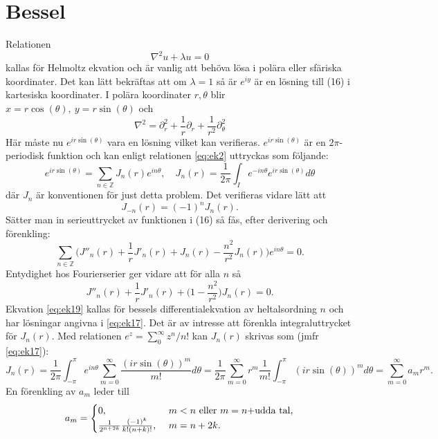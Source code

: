 \documentclass{article}
\begin{document}
\section{Bessel}
Relationen
\begin{equation}
    \nabla^2u+\lambda u=0
\end{equation} 
kallas för Helmoltz ekvation och är vanlig att behöva lösa i polära eller sfäriska koordinater. Det kan lätt bekräftas att om $\lambda=1$ så är $e^{iy}$ är en lösning till (16) i kartesiska koordinater. I polära koordinater $r,\theta$ blir $x=r\cos(\theta), \ y=r\sin(\theta)$ och
$$
\nabla^2=\partial_r^2+\frac{1}{r}\partial_r+\frac{1}{r^2}\partial_{\theta}^2
$$
Här måste nu $e^{ir\sin(\theta)}$ vara en lösning vilket kan verifieras. $e^{ir\sin(\theta)}$ är en $2\pi$-periodisk funktion och kan enligt relationen \eqref{eq:ek2} uttryckas som följande:
\begin{equation}\label{eq:ek17}
    e^{ir\sin(\theta)}=\sum_{n\in\mathbb{Z}}J_n(r)e^{in\theta}, \quad J_n(r)=\frac{1}{2\pi}\int_Ie^{-in\theta}e^{ir\sin(\theta)}d\theta
\end{equation}
där $J_n$ är konventionen för just detta problem. Det verifieras vidare lätt att
\begin{equation}\label{eq:ek18}
    J_{-n}(r)=(-1)^nJ_n(r).
\end{equation}
Sätter man in serieuttrycket av funktionen i (16) så fås, efter derivering och förenkling:
$$
\sum_{n\in\mathbb{Z}}\Big(J''_n(r)+\frac{1}{r}J'_n(r)+J_n(r)-\frac{n^2}{r^2}J_n(r)\Big)e^{in\theta}=0.
$$
Entydighet hos Fourierserier ger vidare att för alla $n$ så
\begin{equation}\label{eq:ek19}
    J''_n(r)+\frac{1}{r}J'_n(r)+\Big(1-\frac{n^2}{r^2}\Big)J_n(r)=0.
\end{equation}
Ekvation \eqref{eq:ek19} kallas för bessels differentialekvation av heltalsordning $n$ och har lösningar angivna i \eqref{eq:ek17}. Det är av intresse att förenkla integraluttrycket för $J_n(r)$. Med relationen $e^{z}=\sum_0^{\infty}z^n/n!$ kan $J_n(r)$ skrivas som (jmfr \eqref{eq:ek17}):
$$
J_n(r)=\frac{1}{2\pi}\int_{-\pi}^{\pi}e^{in\theta}\sum_{m=0}^{\infty}\frac{(ir\sin(\theta))^m}{m!}d\theta=\frac{1}{2\pi}\sum_{m=0}^{\infty}r^m\frac{1}{m!}\int_{-\pi}^{\pi}(ir\sin(\theta))^md\theta=\sum_{m=0}^{\infty}a_mr^m.
$$
En förenkling av $a_m$ leder till
\begin{equation*}
    a_m=
    \begin{cases}
        0, \ &m<n \ $eller$ \ m=n+$udda tal$,\\
        \frac{1}{2^{n+2k}}\frac{(-1)^k}{k!(n+k)!}, \ &m=n+2k.
    \end{cases}
\end{equation*}
\end{document}
